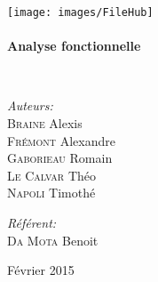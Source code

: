 \begin{titlepage}
\begin{center}


\texttt{[image: images/FileHub]}~\\[2cm]



\HRule \\[0.4cm]
{ \huge \bfseries Analyse fonctionnelle \\[0.4cm] }

\HRule \\[1.5cm]

\begin{minipage}{0.4\textwidth}
\begin{flushleft} \large
\emph{Auteurs:}\\
\textsc{Braine} Alexis\\
\textsc{Frémont} Alexandre\\
\textsc{Gaborieau} Romain\\
\textsc{Le Calvar} Théo\\
\textsc{Napoli} Timothé

\end{flushleft}
\end{minipage}
\begin{minipage}{0.4\textwidth}
\begin{flushright} \large
\emph{Référent:} \\
\textsc{Da Mota} Benoit
\end{flushright}
\end{minipage}

\vfill

{\large Février 2015}

\end{center}
\end{titlepage}